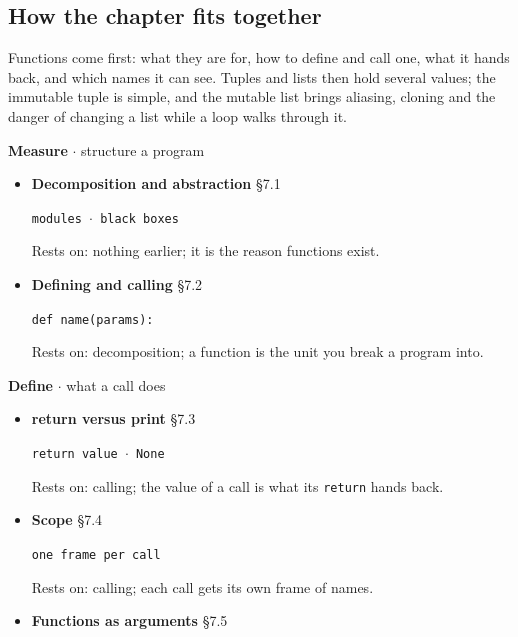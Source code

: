 \documentclass[11pt]{article}
\begin{document}
\begin{keepsection}
\section{How the chapter fits together}

Functions come first: what they are for, how to define and call one, what it hands back, and which names it can see. Tuples and lists then hold several values; the immutable tuple is simple, and the mutable list brings aliasing, cloning and the danger of changing a list while a loop walks through it.

\textbf{Measure} \ensuremath{\cdot} structure a program

\begin{itemize}
\item {}
\textbf{Decomposition and abstraction} \hfill{\small\color{FAUblue}§7.1}

\texttt{modules \ensuremath{\cdot} black boxes}

Rests on: nothing earlier; it is the reason functions exist.
\item {}
\textbf{Defining and calling} \hfill{\small\color{FAUblue}§7.2}

\texttt{def name(params):}

Rests on: decomposition; a function is the unit you break a program into.
\end{itemize}

\textbf{Define} \ensuremath{\cdot} what a call does

\begin{itemize}
\item {}
\textbf{return versus print} \hfill{\small\color{FAUblue}§7.3}

\texttt{return value \ensuremath{\cdot} None}

Rests on: calling; the value of a call is what its \texttt{return} hands back.
\item {}
\textbf{Scope} \hfill{\small\color{FAUblue}§7.4}

\texttt{one frame per call}

Rests on: calling; each call gets its own frame of names.
\item {}
\textbf{Functions as arguments} \hfill{\small\color{FAUblue}§7.5}


\end{itemize}
\end{keepsection}
\end{document}
